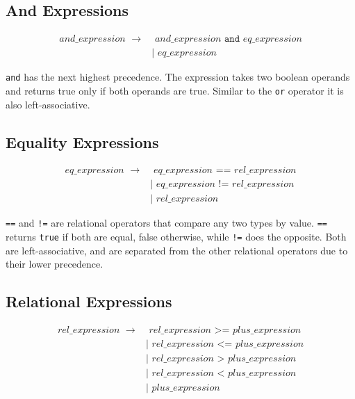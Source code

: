 \documentclass{article}
\newcommand{\code}{\texttt}
\begin{document}
\subsection{And Expressions}
\begin{align*}
and\_expression\,\,\rightarrow&  \,\,and\_expression\,\,\code{and}\,\,eq\_expression \\
                              &| \,\,eq\_expression                                 
\end{align*}

\code{and} has the next highest precedence. The expression takes two boolean operands and returns true only if both operands are true. Similar to the \code{or} operator it is also left-associative.

\subsection{Equality Expressions}
\begin{align*}
eq\_expression\,\,\rightarrow&  \,\,eq\_expression\,\,\code{==}\,\,rel\_expression \\
                             &| \,\,eq\_expression\,\,\code{!=}\,\,rel\_expression \\
                             &| \,\,rel\_expression
\end{align*}

\code{==} and \code{!=} are relational operators that compare any two types by value. \code{==} returns \code{true} if both are equal, false otherwise, while \code{!=} does the opposite. Both are left-associative, and are separated from the other relational operators due to their lower precedence.

\subsection{Relational Expressions}
\begin{align*}
rel\_expression\,\,\rightarrow&  \,\,rel\_expression\,\,\code{>=}\,\,plus\_expression    \\
                              &| \,\,rel\_expression\,\,\code{<=}\,\,plus\_expression    \\
                              &| \,\,rel\_expression\,\,\code{>}\,\,plus\_expression\,\, \\
                              &| \,\,rel\_expression\,\,\code{<}\,\,plus\_expression\,\, \\
                              &| \,\,plus\_expression
\end{align*}
\end{document}
